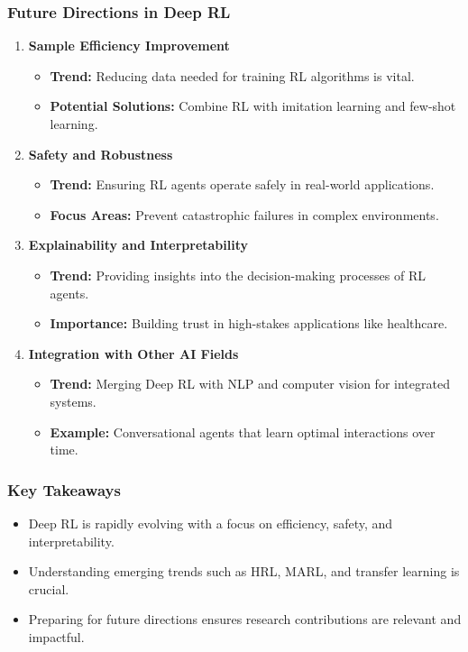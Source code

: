 \documentclass[aspectratio=169]{beamer}
\begin{document}
\begin{frame}[fragile]
  \frametitle{Future Directions in Deep RL}
  \begin{enumerate}
    \item \textbf{Sample Efficiency Improvement}
      \begin{itemize}
        \item \textbf{Trend:} Reducing data needed for training RL algorithms is vital.
        \item \textbf{Potential Solutions:} Combine RL with imitation learning and few-shot learning.
      \end{itemize}

    \item \textbf{Safety and Robustness}
      \begin{itemize}
        \item \textbf{Trend:} Ensuring RL agents operate safely in real-world applications.
        \item \textbf{Focus Areas:} Prevent catastrophic failures in complex environments.
      \end{itemize}

    \item \textbf{Explainability and Interpretability}
      \begin{itemize}
        \item \textbf{Trend:} Providing insights into the decision-making processes of RL agents.
        \item \textbf{Importance:} Building trust in high-stakes applications like healthcare.
      \end{itemize}

    \item \textbf{Integration with Other AI Fields}
      \begin{itemize}
        \item \textbf{Trend:} Merging Deep RL with NLP and computer vision for integrated systems.
        \item \textbf{Example:} Conversational agents that learn optimal interactions over time.
      \end{itemize}
  \end{enumerate}
\end{frame}

\begin{frame}[fragile]
  \frametitle{Key Takeaways}
  \begin{itemize}
    \item Deep RL is rapidly evolving with a focus on efficiency, safety, and interpretability.
    \item Understanding emerging trends such as HRL, MARL, and transfer learning is crucial.
    \item Preparing for future directions ensures research contributions are relevant and impactful.
  \end{itemize}
\end{frame}
\end{document}

